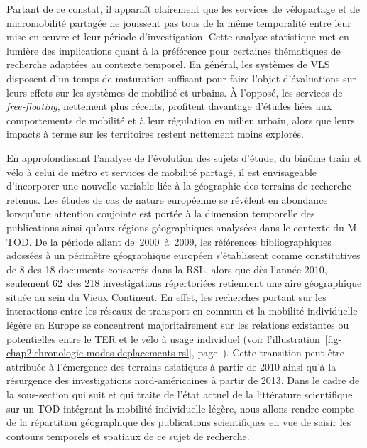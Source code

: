 \begin{refsegment}
Partant de ce constat, il apparaît clairement que les services de vélopartage et de micromobilité partagée ne jouissent pas tous de la même temporalité entre leur mise en œuvre et leur période d'investigation. Cette analyse statistique met en lumière des implications quant à la préférence pour certaines thématiques de recherche adaptées au contexte temporel. En général, les systèmes de \acrshort{VLS} disposent d'un temps de maturation suffisant pour faire l'objet d'évaluations sur leurs effets sur les systèmes de mobilité et urbains. À l'opposé, les services de \textsl{free-floating}, nettement plus récents, profitent davantage d'études liées aux comportements de mobilité et à leur régulation en milieu urbain, alors que leurs impacts à terme sur les territoires restent nettement moins explorés.%

En approfondissant l'analyse de l'évolution des sujets d'étude, du binôme train et vélo à celui de métro et services de mobilité partagé, il est envisageable d'incorporer une nouvelle variable liée à la géographie des terrains de recherche retenus. Les études de cas de nature européenne se révèlent en abondance lorsqu'une attention conjointe est portée à la dimension temporelle des publications ainsi qu'aux régions géographiques analysées dans le contexte du \acrshort{M-TOD}. De la période allant de~2000~à~2009, les références bibliographiques adossées à un périmètre géographique européen s'établissent comme constitutives de 8 des 18 documents consacrés dans la \acrshort{RSL}, alors que dès l'année 2010, seulement 62~des 218 investigations répertoriées retiennent une aire géographique située au sein du Vieux Continent. En effet, les recherches portant sur les interactions entre les réseaux de transport en commun et la mobilité individuelle légère en Europe se concentrent majoritairement sur les relations existantes ou potentielles entre le \acrshort{TER} et le vélo à usage individuel (voir l'\hyperref[fig-chap2:chronologie-modes-deplacements-rsl]{illustration~\ref{fig-chap2:chronologie-modes-deplacements-rsl}}, page~\pageref{fig-chap2:chronologie-modes-deplacements-rsl}). Cette transition peut être attribuée à l'émergence des terrains asiatiques à partir de 2010 ainsi qu'à la résurgence des investigations nord-américaines à partir de 2013. Dans le cadre de la sous-section qui suit et qui traite de l'état actuel de la littérature scientifique sur un \acrshort{TOD} intégrant la mobilité individuelle légère, nous allons rendre compte de la répartition géographique des publications scientifiques en vue de saisir les contours temporels et spatiaux de ce sujet de recherche.%


\end{refsegment}
